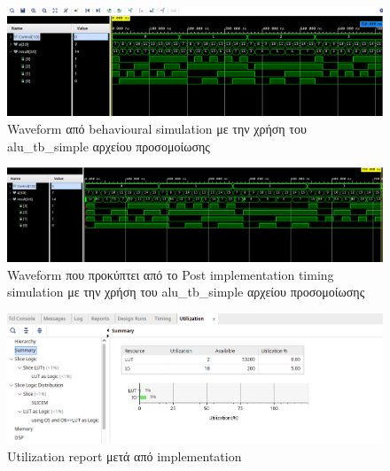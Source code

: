 \documentclass[11pt, a4paper]{report}
\begin{document}
\begin{figure}
  \includegraphics[width=\textwidth]{./images/alu-2/beh-sim-overview.png}
  \caption{Waveform από behavioural simulation με την χρήση του alu\_tb\_simple αρχείου προσομοίωσης}
  \label{fig:beh_overview}
\end{figure}

\newpage

\begin{figure}
  \includegraphics[width=\textwidth]{./images/alu-2/pits.png}
  \caption{Waveform που προκύπτει από το Post implementation timing simulation με την χρήση του alu\_tb\_simple αρχείου προσομοίωσης}
  \label{fig:pits}
\end{figure}

\begin{figure}
  \includegraphics[width=\textwidth]{./images/alu-2/impl-util.png}
  \caption{Utilization report μετά από implementation}
  \label{fig:util}
\end{figure}
\end{document}
